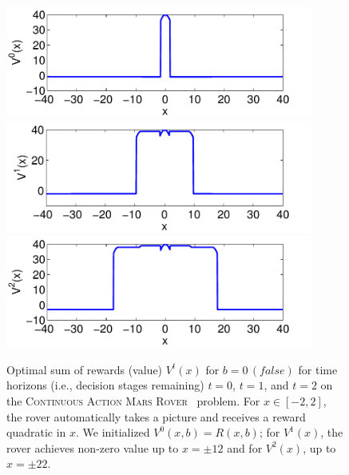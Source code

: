 \documentclass[twoside,11pt]{article}
\newcommand{\MarsRover}{\textsc{Mars Rover }}
\newcommand{\false}{\mathit{false}}
\begin{document}
\begin{figure}[t!]
\begin{minipage}[b]{0.48\linewidth}
\includegraphics[width=0.9\textwidth]{pics/v1_2d.pdf}\\
\includegraphics[width=0.9\textwidth]{pics/v2_2d.pdf}\\
\includegraphics[width=0.9\textwidth]{pics/v3_2d.pdf}

\caption{\footnotesize Optimal sum of rewards (value) 
$V^t(x)$ for $b = 0 \, 
(\false)$ for time horizons (i.e., decision stages remaining) $t=0$,
$t=1$, and $t=2$ on the \textsc{Continuous Action}  \MarsRover\ problem.  For $x \in [-2,2]$, the
rover automatically takes a picture and receives a reward quadratic in
$x$.  We initialized $V^0(x,b) = R(x,b)$; for $V^1(x)$, the rover achieves
non-zero value up to $x = \pm 12$ and for 
$V^2(x)$, up to $x = \pm 22$.}
\label{fig:opt_graph}


\end{minipage}
\end{figure}
\end{document}
